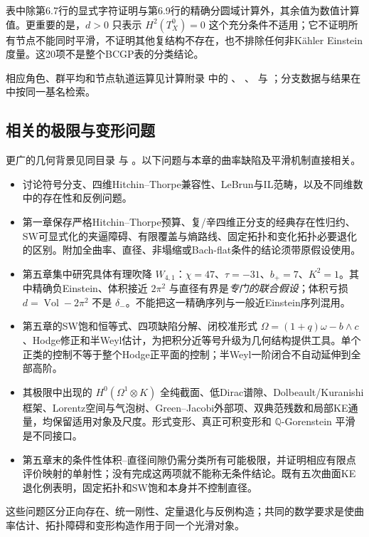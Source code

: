 \documentclass[UTF8,a4paper,11pt,fontset=fandol]{ctexart}
\numberwithin{equation}{section}
\theoremstyle{definition}
\newcommand{\Vol}{\operatorname{Vol}}
\begin{document}
表中除第6.7行的显式字符证明与第6.9行的精确分圆域计算外，其余值为数值计算值。更重要的是，$d>0$ 只表示 $H^2(T_X^0)=0$ 这个充分条件不适用；它不证明所有节点不能同时平滑，不证明其他复结构不存在，也不排除任何非K\"ahler Einstein度量。这20项不是整个BCGP表的分类结论。


相应角色、群平均和节点轨道运算见计算附录
 中的
、
、
 与
；分支数据与结果在
 中按同一基名检索。

\subsection{相关的极限与变形问题}
更广的几何背景见同目录  与 。以下问题与本章的曲率缺陷及平滑机制直接相关。
\begin{itemize}
\item {} 讨论符号分支、四维Hitchin--Thorpe兼容性、LeBrun与IL范畴，以及不同维数中的存在性和反例问题。
\item {} 第一章保存严格Hitchin--Thorpe预算、复/辛四维正分支的经典存在性归约、SW可显式化的夹逼障碍、有限覆盖与熵路线、固定拓扑和变化拓扑必要退化的区别。附加全曲率、直径、非塌缩或Bach-flat条件的结论须带原假设使用。
\item 第五章集中研究具体有理吹降 $W_{4,1}$：$\chi=47$、$\tau=-31$、$b_+=7$、$K^2=1$。其中精确负Einstein、体积接近 $2\pi^2$ 与直径有界是\emph{专门的联合假设}；体积亏损 $d=\Vol-2\pi^2$ 不是 $\delta_-$。不能把这一精确序列与一般近Einstein序列混用。
\item 第五章的SW饱和恒等式、四项缺陷分解、闭校准形式 $\Omega=(1+q)\omega-b\wedge c$、Hodge修正和半Weyl估计，为把积分近等号升级为几何结构提供工具。单个正类的控制不等于整个Hodge正平面的控制；半Weyl一阶闭合不自动延伸到全部高阶。
\item 其极限中出现的 $H^0(\Omega^1\otimes K)$ 全纯截面、低Dirac谱隙、Dolbeault/Kuranishi框架、Lorentz空间与气泡树、Green--Jacobi外部项、双典范残数和局部KE通量，均保留适用对象及尺度。形式变形、真正可积变形和 $\mathbb Q$-Gorenstein 平滑是不同接口。
\item 第五章末的条件性体积--直径间隙仍需分类所有可能极限，并证明相应有限点评价映射的单射性；没有完成这两项就不能称无条件结论。既有五次曲面KE退化例表明，固定拓扑和SW饱和本身并不控制直径。
\end{itemize}
这些问题区分正向存在、统一刚性、定量退化与反例构造；共同的数学要求是使曲率估计、拓扑障碍和变形构造作用于同一个光滑对象。
\end{document}
